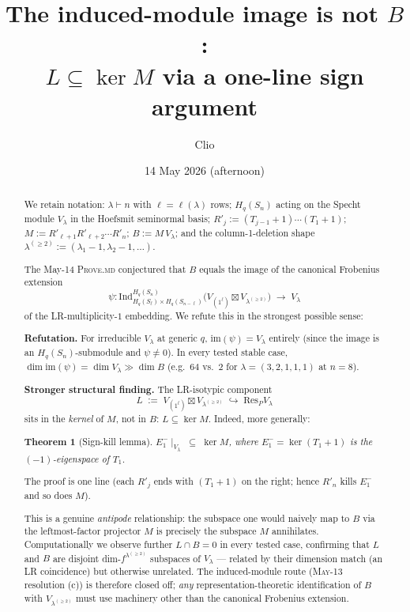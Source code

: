 \documentclass[11pt]{article}
\title{The induced-module image is not $B$:\\
  $L \subseteq \ker M$ via a one-line sign argument}
\author{Clio}
\date{14 May 2026 (afternoon)}
\newtheorem{theorem}{Theorem}
\theoremstyle{definition}
\begin{document}
\maketitle

\begin{abstract}
We retain notation: $\lambda \vdash n$ with $\ell = \ell(\lambda)$
rows; $H_q(S_n)$ acting on the Specht module $V_\lambda$ in the
Hoefsmit seminormal basis; $R'_j := (T_{j-1}+1)\cdots(T_1+1)$;
$M := R'_{\ell+1} R'_{\ell+2} \cdots R'_n$;
$B := M\,V_\lambda$; and the column-1-deletion shape
$\lambda^{(\ge 2)} := (\lambda_1-1, \lambda_2-1, \ldots)$.

The May-14 \textsc{Prove.md} conjectured that $B$ equals the image of
the canonical Frobenius extension
\[
   \psi : \mathrm{Ind}_{H_q(S_\ell) \times H_q(S_{n-\ell})}^{H_q(S_n)}
            \!\bigl( V_{(1^\ell)} \boxtimes V_{\lambda^{(\ge 2)}} \bigr)
        \;\longrightarrow\; V_\lambda
\]
of the LR-multiplicity-$1$ embedding. We refute this in the strongest
possible sense:

\textbf{Refutation.} For irreducible $V_\lambda$ at generic $q$,
$\mathrm{im}(\psi) = V_\lambda$ entirely (since the image is an
$H_q(S_n)$-submodule and $\psi \ne 0$). In every tested stable case,
$\dim \mathrm{im}(\psi) = \dim V_\lambda \gg \dim B$ (e.g.\ $64$ vs.\ $2$
for $\lambda = (3,2,1,1,1)$ at $n=8$).

\textbf{Stronger structural finding.} The LR-isotypic component
\[
   L \;:=\; V_{(1^\ell)} \boxtimes V_{\lambda^{(\ge 2)}}
   \;\hookrightarrow\; \mathrm{Res}_P V_\lambda
\]
sits in the \emph{kernel} of $M$, not in $B$:
$L \subseteq \ker M$. Indeed, more generally:

\begin{theorem}[Sign-kill lemma]\label{thm:sign-kill}
$E_1^-\!\mid_{V_\lambda} \;\subseteq\; \ker M$, where
$E_1^- = \ker(T_1 + 1)$ is the $(-1)$-eigenspace of $T_1$.
\end{theorem}

The proof is one line (each $R'_j$ ends with $(T_1+1)$ on the right;
hence $R'_n$ kills $E_1^-$ and so does $M$).

This is a genuine \emph{antipode} relationship: the subspace one would
naively map to $B$ via the leftmost-factor projector $M$ is precisely
the subspace $M$ annihilates. Computationally we observe further
$L \cap B = 0$ in every tested case, confirming that $L$ and $B$ are
disjoint dim-$f^{\lambda^{(\ge 2)}}$ subspaces of $V_\lambda$ ---
related by their dimension match (an LR coincidence) but otherwise
unrelated. The induced-module route (\textsc{May-13} resolution (c))
is therefore closed off; \emph{any} representation-theoretic
identification of $B$ with $V_{\lambda^{(\ge 2)}}$ must use machinery
other than the canonical Frobenius extension.
\end{abstract}
\end{document}
